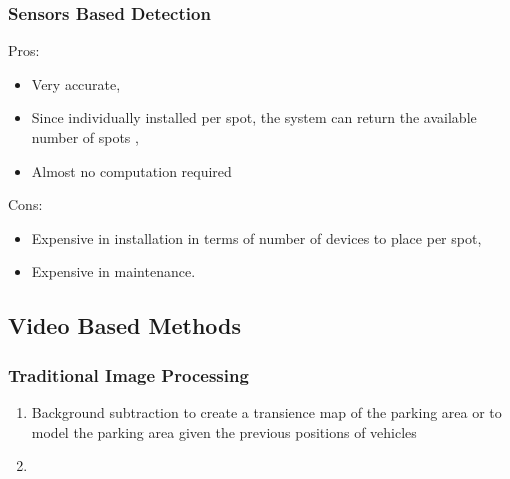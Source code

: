 \documentclass{beamer}
\begin{document}
\begin{frame}
\frametitle{Sensors Based Detection}

Pros:
\begin{itemize}
	\item Very accurate,
	\item Since individually installed per spot, the system can return the available number of spots \cite{Lee2008},
	\item Almost no computation required
\end{itemize}

Cons:
\begin{itemize}
	\item Expensive in installation in terms of number of devices to place per spot,
	\item Expensive in maintenance.
\end{itemize}

\end{frame}

\subsection{Video Based Methods}

\begin{frame}
\frametitle{Traditional Image Processing}
\begin{enumerate}
\item Background subtraction to create a transience map of the parking area or to model the parking area given the previous positions of vehicles
\item 
\end{enumerate}
\end{frame}
\end{document}
